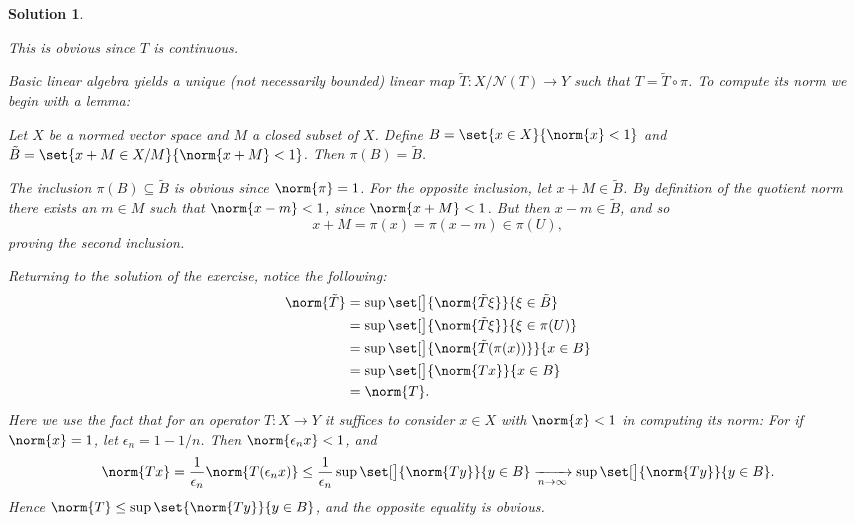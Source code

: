 \documentclass[article, a4paper, 11pt, oneside]{memoir}
\numberwithin{equation}{chapter}
\newcommand{\calN}{\mathcal{N}}
\theoremstyle{nonumberplain}
\newtheorem{solution}{Solution}
\begin{document}
\begin{solution}
\begin{solutionsec}
	\item This is obvious since $T$ is continuous.
	
	\item Basic linear algebra yields a unique (not necessarily bounded) linear map $\tilde{T} \colon X/\calN(T) \to Y$ such that $T = \tilde{T} \circ \pi$. To compute its norm we begin with a lemma:
	\begin{displayquote} %
		\itshape
		Let $X$ be a normed vector space and $M$ a closed subset of $X$. Define $B = \set{x \in X}{ \norm{x} < 1 }$ and $\tilde{B} = \set{x + M \in X/M}{ \norm{x+M} < 1 }$. Then $\pi(B) = \tilde{B}$.
	\end{displayquote}
	The inclusion $\pi(B) \subseteq \tilde{B}$ is obvious since $\norm{\pi} = 1$. For the opposite inclusion, let $x + M \in \tilde{B}$. By definition of the quotient norm there exists an $m \in M$ such that $\norm{x - m} < 1$, since $\norm{x + M} < 1$. But then $x - m \in \tilde{B}$, and so
	\begin{equation*}
		x + M
			= \pi(x)
			= \pi(x - m)
			\in \pi(U),
	\end{equation*}
	proving the second inclusion.

	Returning to the solution of the exercise, notice the following:
	\begin{align*}
		\norm{\tilde{T}}
			&= \sup\set[\big]{ \norm{\tilde{T}\xi} }{\xi \in \tilde{B}} \\
			&= \sup\set[\big]{ \norm{\tilde{T}\xi} }{\xi \in \pi(U)} \\
			&= \sup\set[\big]{ \norm{\tilde{T}(\pi(x))} }{x \in B} \\
			&= \sup\set[\big]{ \norm{Tx} }{x \in B} \\
			&= \norm{T}.
	\end{align*}
	Here we use the fact that for an operator $T \colon X \to Y$ it suffices to consider $x \in X$ with $\norm{x} < 1$ in computing its norm: For if $\norm{x} = 1$, let $\epsilon_n = 1 - 1/n$. Then $\norm{\epsilon_n x} < 1$, and
	\begin{equation*}
		\norm{Tx}
			= \frac{1}{\epsilon_n} \norm{T(\epsilon_n x)}
			\leq \frac{1}{\epsilon_n} \sup\set[\big]{ \norm{Ty} }{y \in B}
			\xrightarrow[n\to\infty]{} \sup\set[\big]{ \norm{Ty} }{y \in B}.
	\end{equation*}
	Hence $\norm{T} \leq \sup\set{ \norm{Ty} }{y \in B}$, and the opposite equality is obvious.
\end{solutionsec}
\end{solution}
\end{document}
